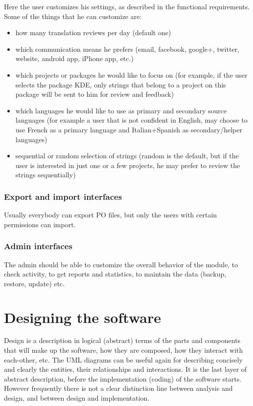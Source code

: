 \documentclass[11pt]{article}
\begin{document}
    Here the user customizes his settings, as described in the
    functional requirements.  Some of the things that he can customize
    are:
\begin{itemize}
\item how many translation reviews per day (default one)
\item which communication means he prefers (email, facebook, google+,
       twitter, website, android app, iPhone app, etc.)
\item which projects or packages he would like to focus on (for
       example, if the user selects the package KDE, only strings that
       belong to a project on this package will be sent to him for
       review and feedback)
\item which languages he would like to use as primary and secondary
       source languages (for example a user that is not confident in
       English, may choose to use French as a primary language and
       Italian+Spanish as secondary/helper languages)
\item sequential or random selection of strings (random is the
       default, but if the user is interested in just one or a few
       projects, he may prefer to review the strings sequentially)
\end{itemize}
\subsubsection{Export and import interfaces}
\label{sec-4.2.4}


    Usually everybody can export PO files, but only the users with
    certain permissions can import.


\subsubsection{Admin interfaces}
\label{sec-4.2.5}


    The admin should be able to customize the overall behavior of the
    module, to check activity, to get reports and statistics, to
    maintain the data (backup, restore, update) etc.


\section{Designing the software}
\label{sec-5}


  Design is a description in logical (abstract) terms of the parts and
  components that will make up the software, how they are composed,
  how they interact with each-other, etc. The UML diagrams can be
  useful again for describing concisely and clearly the entities,
  their relationships and interactions.  It is the last layer of
  abstract description, before the implementation (coding) of the
  software starts. However frequently there is not a clear distinction
  line between analysis and design, and between design and
  implementation.
\end{document}
